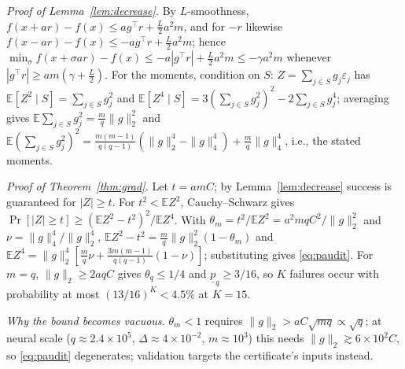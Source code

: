 \documentclass{article}
\newcommand{\E}{\mathbb{E}}
\newcommand{\D}{\Delta}
\begin{document}
\emph{Proof of Lemma~\ref{lem:decrease}.} By $L$-smoothness, $f(x+ar)-f(x)\le ag^\top r+\frac L2a^2m$, and for $-r$ likewise $f(x-ar)-f(x)\le-ag^\top r+\frac L2a^2m$; hence $\min_\sigma f(x+\sigma ar)-f(x)\le-a|g^\top r|+\frac L2a^2m\le-\gamma a^2m$ whenever $|g^\top r|\ge am(\gamma+\frac L2)$. For the moments, condition on $S$: $Z=\sum_{j\in S}g_j\varepsilon_j$ has $\E[Z^2\mid S]=\sum_{j\in S}g_j^2$ and $\E[Z^4\mid S]=3(\sum_{j\in S}g_j^2)^2-2\sum_{j\in S}g_j^4$; averaging gives $\E\sum_{j\in S}g_j^2=\frac mq\|g\|_2^2$ and $\E(\sum_{j\in S}g_j^2)^2=\frac{m(m-1)}{q(q-1)}(\|g\|_2^4-\|g\|_4^4)+\frac mq\|g\|_4^4$, i.e., the stated moments.

\emph{Proof of Theorem~\ref{thm:grad}.} Let $t=amC$; by Lemma~\ref{lem:decrease} success is guaranteed for $|Z|\ge t$. For $t^2<\E Z^2$, Cauchy--Schwarz gives $\Pr[|Z|\ge t]\ge(\E Z^2-t^2)^2/\E Z^4$. With $\theta_m=t^2/\E Z^2=a^2mqC^2/\|g\|_2^2$ and $\nu=\|g\|_4^4/\|g\|_2^4$, $\E Z^2-t^2=\frac mq\|g\|_2^2(1-\theta_m)$ and $\E Z^4=\|g\|_2^4[\frac mq\nu+\frac{3m(m-1)}{q(q-1)}(1-\nu)]$; substituting gives \eqref{eq:paudit}. For $m=q$, $\|g\|_2\ge2aqC$ gives $\theta_q\le1/4$ and $\underline p_q\ge3/16$, so $K$ failures occur with probability at most $(13/16)^K<4.5\%$ at $K=15$.

\emph{Why the bound becomes vacuous.} $\theta_m<1$ requires $\|g\|_2>aC\sqrt{mq}\propto\sqrt q$; at neural scale ($q\approx2.4\times10^5$, $\D\approx4\times10^{-2}$, $m\approx10^3$) this needs $\|g\|_2\gtrsim6\times10^2C$, so \eqref{eq:paudit} degenerates; validation targets the certificate's inputs instead.

\clearpage


\end{document}
